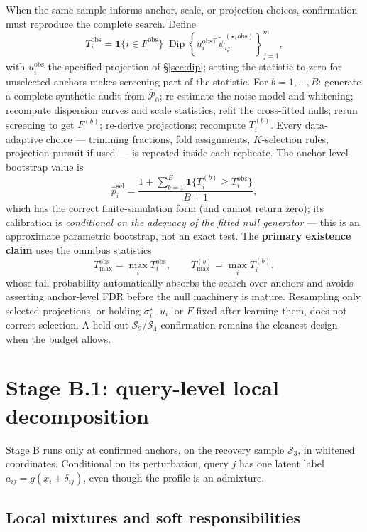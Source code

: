 \documentclass[11pt]{article}
\newcommand{\Ind}{\mathbf{1}}
\newcommand{\Dip}{\operatorname{Dip}}
\newcommand{\nullgen}{\widehat{\mathcal P}_0}
\begin{document}
When the same sample informs anchor, scale, or projection choices, confirmation must
reproduce the complete search. Define
\[
  T_i^{\mathrm{obs}}
  =\Ind\{i\in F^{\mathrm{obs}}\}\;
  \Dip\!\left\{u_i^{\mathrm{obs}\top}\tilde\psi_{ij}^{(\star,\mathrm{obs})}\right\}_{j=1}^m,
\]
with \(u_i^{\mathrm{obs}}\) the specified projection of \S\ref{sec:dip}; setting the
statistic to zero for unselected anchors makes screening part of the statistic. For
\(b=1,\ldots,B\): generate a complete synthetic audit from \(\nullgen\); re-estimate the noise
model and whitening; recompute dispersion curves and scale statistics; refit the cross-fitted
nulls; rerun screening to get \(F^{(b)}\); re-derive projections; recompute
\(T_i^{(b)}\). Every data-adaptive choice --- trimming fractions, fold assignments,
\(K\)-selection rules, projection pursuit if used --- is repeated inside each replicate.
The anchor-level bootstrap value is
\[
  \widehat p_i^{\mathrm{sel}}
  =\frac{1+\sum_{b=1}^B\Ind\{T_i^{(b)}\ge T_i^{\mathrm{obs}}\}}{B+1},
\]
which has the correct finite-simulation form (and cannot return zero); its calibration is
\emph{conditional on the adequacy of the fitted null generator} --- this is an approximate
parametric bootstrap, not an exact test. The \textbf{primary existence claim} uses the
omnibus statistics
\[
  T_{\max}^{\mathrm{obs}}=\max_i T_i^{\mathrm{obs}},
  \qquad
  T_{\max}^{(b)}=\max_i T_i^{(b)},
\]
whose tail probability automatically absorbs the search over anchors and avoids asserting
anchor-level FDR before the null machinery is mature. Resampling only selected projections,
or holding \(\sigma_i^\star\), \(u_i\), or \(F\) fixed after learning them, does not correct
selection. A held-out \(\mathcal S_2\)/\(\mathcal S_4\) confirmation remains the cleanest
design when the budget allows.

\section{Stage B.1: query-level local decomposition}

Stage B runs only at confirmed anchors, on the recovery sample \(\mathcal S_3\), in whitened
coordinates. Conditional on its perturbation, query \(j\) has one latent label
\(a_{ij}=g(x_i+\delta_{ij})\), even though the profile is an admixture.

\subsection{Local mixtures and soft responsibilities}
\label{sec:soft}
\end{document}
